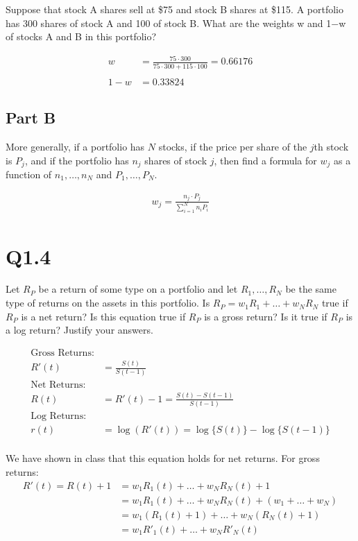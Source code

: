 \documentclass[
  oneside]{book}
\begin{document}
Suppose that stock A shares sell at \$75 and stock B shares at \$115. A portfolio has 300 shares of stock A and 100 of stock B. What are the weights w and 1−w of stocks A and B in this portfolio?

\[
\begin{aligned}
w &= \frac{75\cdot 300}{75\cdot 300 + 115 \cdot 100} = 0.66176\\
\\
1-w &= 0.33824
\end{aligned}
\]

\hypertarget{part-b-6}{%
\subsection{Part B}\label{part-b-6}}

More generally, if a portfolio has \(N\) stocks, if the price per share of the \(j\)th stock is \(P_j\), and if the portfolio has \(n_j\) shares of stock \(j\), then find a formula for \(w_j\) as a function of \(n_{1},\dots,n_{N}\) and \(P_{1},\dots,P_{N}\).

\[
\begin{aligned}
w_{j} = \frac{n_{j}\cdot P_{j}}{\sum^{N}_{i=1}n_{i}P_{i}}
\end{aligned}
\]

\hypertarget{q1.4}{%
\section{Q1.4}\label{q1.4}}

Let \(R_{P}\) be a return of some type on a portfolio and let \(R_{1},\dots, R_{N}\) be the same type of returns on the assets in this portfolio. Is \(R_P = w_{1}R_{1}+ \dots + w_{N}R_{N}\) true if \(R_{P}\) is a net return? Is this equation true if \(R_{P}\) is a gross return? Is it true if \(R_{P}\) is a log return? Justify your answers.

\[
\begin{aligned}
\text{Gross Returns:}&\\
R'(t) &= \frac{S(t)}{S(t-1)}\\
\text{Net Returns:}&\\
R(t) &= R'(t)-1 = \frac{S(t)-S(t-1)}{S(t-1)}\\
\text{Log Returns:}&\\
r(t) &= \log(R'(t)) = \log\{S(t)\}-\log\{S(t-1)\}\\
\end{aligned}
\]

We have shown in class that this equation holds for net returns. For gross returns:
\[
\begin{aligned}
R'(t) = R(t)+1 &= w_{1}R_{1}(t) + \dots + w_{N}R_{N}(t) + 1\\
&= w_{1}R_{1}(t) + \dots + w_{N}R_{N}(t) + (w_{1}+\dots+w_{N})\\
&= w_{1}(R_{1}(t)+1) + \dots + w_{N}(R_{N}(t)+1)\\
&= w_{1}R'_{1}(t) + \dots + w_{N}R'_{N}(t)
\end{aligned}
\]
\end{document}
